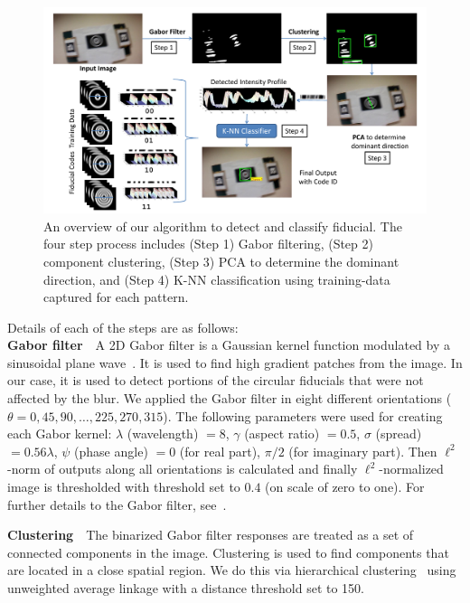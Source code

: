 \documentclass[runningheads]{llncs}
\begin{document}
\begin{figure}[ht!]
\includegraphics[width=\linewidth]{overall_flow.pdf}
\caption{An overview of our algorithm to detect and classify fiducial.
The four step process includes (Step 1) Gabor filtering,
(Step 2) component clustering, (Step 3) PCA to determine the dominant direction,
and (Step 4) K-NN classification using training-data captured for each pattern.}
\label{fig:overall_flow}
\end{figure}

\noindent Details of each of the steps are as follows:\\
\noindent\textbf{Gabor filter}~~A 2D Gabor filter is a Gaussian kernel function
modulated by a sinusoidal plane wave~\cite{Kruizinga:2002}. It is used to find
high gradient patches from the image. In our case, it is used to detect portions
of the circular fiducials that were not affected by the blur. 
We applied the Gabor filter in eight
different orientations ($\theta = 0, 45, 90, \ldots ,225, 270, 315$).  The
following parameters were used for creating each Gabor kernel: $\lambda$ (wavelength) $= 8$, $\gamma$
(aspect ratio) $= 0.5$, $\sigma$ (spread) $= 0.56\lambda$, $\psi$
(phase angle) $= 0$ (for real part), $\pi/2$ (for imaginary part).
Then $\ell^2$-norm of outputs along all orientations is calculated and finally
$\ell^2$-normalized image is thresholded with threshold set to $0.4$ (on scale of zero to
one).  For further details to the Gabor filter, see~\cite{Kruizinga:2002}.

\noindent\textbf{Clustering}~~The binarized Gabor filter responses are
treated as a set of connected components in the image.   Clustering
is used to find components that are located in a close spatial region.  We do
this via hierarchical clustering~\cite{ALGLIB} using unweighted
average linkage with a distance threshold set to 150.
\end{document}

